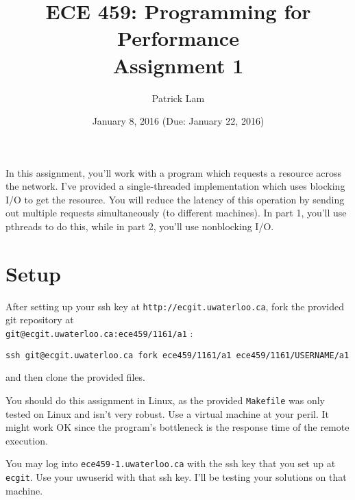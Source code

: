 \documentclass[letterpaper,10pt]{article}
\title{\bf ECE 459: Programming for Performance\\Assignment 1}
\author{Patrick Lam}
\date{January 8, 2016 (Due: January 22, 2016)}
\begin{document}
\maketitle

In this assignment, you'll work with a program which requests a
resource across the network. I've provided 
a single-threaded implementation which uses blocking I/O to get the
resource. You will reduce the latency of this operation by sending out
multiple requests simultaneously (to different machines). In part 1,
you'll use pthreads to do this, while in part 2, you'll use
nonblocking I/O.

\section*{Setup}


After setting up your ssh key at {\tt http://ecgit.uwaterloo.ca}, fork the provided git repository at\\ {\tt git@ecgit.uwaterloo.ca:ece459/1161/a1} : 

\begin{center}
{\tt ssh git@ecgit.uwaterloo.ca fork ece459/1161/a1 ece459/1161/USERNAME/a1}
\end{center}

\noindent and then clone the provided files. %

You should do this assignment in Linux, as the provided {\tt Makefile}
was only tested on Linux and isn't very robust. Use a virtual machine
at your peril. It might work OK since the program's bottleneck is the
response time of the remote execution. 

You may log into {\tt ece459-1.uwaterloo.ca} with the ssh key that you
set up at {\tt ecgit}. Use your uwuserid with
that ssh key. I'll be testing your solutions on that machine.

\end{document}
